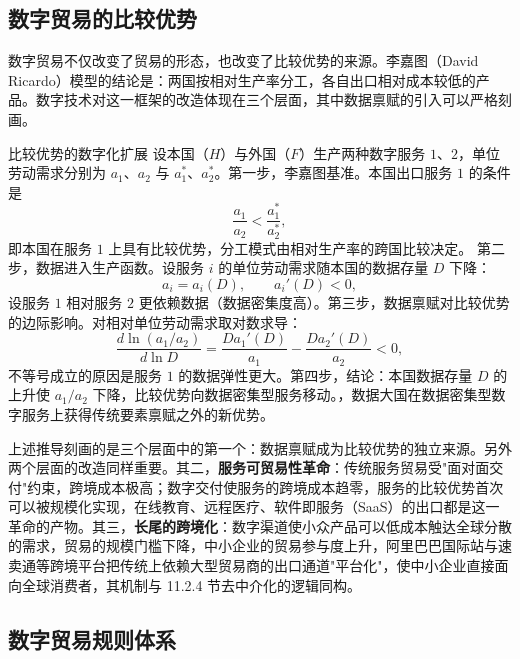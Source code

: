 \subsection{数字贸易的比较优势}

数字贸易不仅改变了贸易的形态，也改变了比较优势的来源。李嘉图（David Ricardo）模型的结论是：两国按相对生产率分工，各自出口相对成本较低的产品。数字技术对这一框架的改造体现在三个层面，其中数据禀赋的引入可以严格刻画。

\begin{derivation}{比较优势的数字化扩展}{}
设本国（$H$）与外国（$F$）生产两种数字服务 $1$、$2$，单位劳动需求分别为 $a_1$、$a_2$ 与 $a_1^*$、$a_2^*$。第一步，李嘉图基准。本国出口服务 $1$ 的条件是
\[
\frac{a_1}{a_2} < \frac{a_1^*}{a_2^*},
\]
即本国在服务 $1$ 上具有比较优势，分工模式由相对生产率的跨国比较决定。
第二步，数据进入生产函数。设服务 $i$ 的单位劳动需求随本国的数据存量 $D$ 下降：
\[
a_i = a_i(D), \qquad a_i'(D) < 0,
\]
设服务 $1$ 相对服务 $2$ 更依赖数据（数据密集度高）。第三步，数据禀赋对比较优势的边际影响。对相对单位劳动需求取对数求导：
\[
\frac{d\ln(a_1/a_2)}{d\ln D} = \frac{D a_1'(D)}{a_1} - \frac{D a_2'(D)}{a_2} < 0,
\]
不等号成立的原因是服务 $1$ 的数据弹性更大。第四步，结论：本国数据存量 $D$ 的上升使 $a_1/a_2$ 下降，比较优势向数据密集型服务移动。，数据大国在数据密集型数字服务上获得传统要素禀赋之外的新优势。
\end{derivation}

上述推导刻画的是三个层面中的第一个：数据禀赋成为比较优势的独立来源。另外两个层面的改造同样重要。其二，\textbf{服务可贸易性革命}：传统服务贸易受"面对面交付"约束，跨境成本极高；数字交付使服务的跨境成本趋零，服务的比较优势首次可以被规模化实现，在线教育、远程医疗、软件即服务（SaaS）的出口都是这一革命的产物。其三，\textbf{长尾的跨境化}：数字渠道使小众产品可以低成本触达全球分散的需求，贸易的规模门槛下降，中小企业的贸易参与度上升，阿里巴巴国际站与速卖通等跨境平台把传统上依赖大型贸易商的出口通道"平台化"，使中小企业直接面向全球消费者，其机制与 11.2.4 节去中介化的逻辑同构。

\subsection{数字贸易规则体系}

